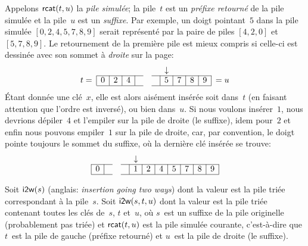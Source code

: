 Appelons \(\textsf{rcat}(t,u)\) la \emph{pile
simulée}; la pile~\(t\) est un
\emph{préfixe retourné} de la pile
simulée et la pile~\(u\) est un
\emph{suffixe}. Par exemple, un doigt
pointant~\(5\) dans la pile simulée \([0,2,4,5,7,8,9]\) serait
représenté par la paire de piles \([4,2,0]\) et \([5,7,8,9]\). Le
retournement de la première pile est mieux compris si celle-ci est
dessinée avec son sommet à \emph{droite} sur la page:
\begin{equation*}
\abovedisplayskip=0pt
\begin{array}{@{}r|c|c|c|ccc|c|c|c|c|l@{}}
  \multicolumn{1}{c}{} & \multicolumn{1}{c}{} & \multicolumn{1}{c}{}
& \multicolumn{1}{c}{} & \multicolumn{1}{c}{} & \multicolumn{1}{c}{}
& \multicolumn{1}{c}{} & \multicolumn{1}{c}{\downarrow}\\
\cline{2-5}\cline{7-11}
t = & 0 & 2 & 4 & & & & 5 & 7 & 8 & 9 & = u\\
\cline{2-5}\cline{7-11}
\end{array}
\end{equation*}
Étant donnée une clé~\(x\), elle est alors aisément insérée soit
dans~\(t\) (en faisant attention que l'ordre est inversé), ou bien
dans~\(u\). Si nous voulons insérer~\(1\), nous devrions dépiler~\(4\)
et l'empiler sur la pile de droite (le suffixe), idem pour~\(2\) et
enfin nous pouvons empiler~\(1\) sur la pile de droite, car, par
convention, le doigt pointe toujours le sommet du suffixe, où la
dernière clé insérée se trouve:
\begin{equation*}
\abovedisplayskip=0pt
\begin{array}{@{}|c|ccc|c|c|c|c|c|c|c|@{}}
  \multicolumn{1}{c}{} & \multicolumn{1}{c}{} & \multicolumn{1}{c}{}
& \multicolumn{1}{c}{} & \multicolumn{1}{c}{\downarrow}\\
\cline{1-2}\cline{4-11}
0 & & & & 1 & 2 & 4 & 5 & 7 & 8 & 9\\
\cline{1-2}\cline{4-11}
\end{array}
\end{equation*}

Soit \(\textsf{i2w}(s)\) (anglais: \emph{insertion
  going two ways}) dont la valeur est la pile triée correspondant à la
pile~\(s\). Soit \(\textsf{i2w}(s,t,u)\) dont la
valeur est la pile triée contenant toutes les clés de~\(s\), \(t\)
et~\(u\), où \(s\)~est un suffixe de la pile originelle (probablement
pas triée) et \(\textsf{rcat}(t,u)\) est la pile
simulée courante, c'est-à-dire que \(t\)~est la pile de gauche
(préfixe retourné) et \(u\)~est la pile de droite (le suffixe).

